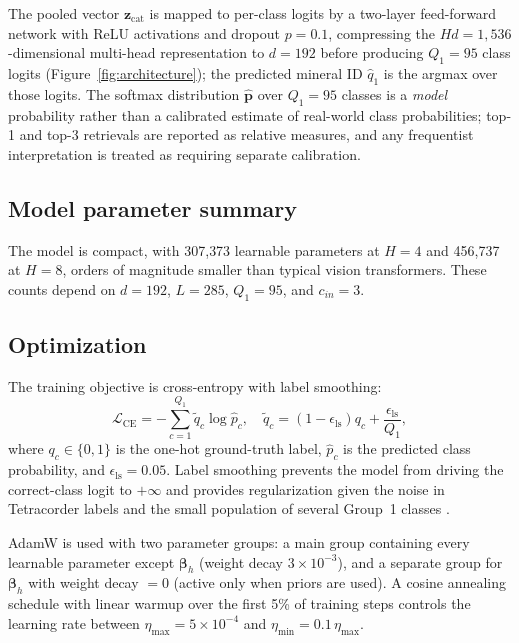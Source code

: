 \documentclass[preprint,12pt]{elsarticle}
\begin{document}
The pooled vector $\mathbf{z}_{\text{cat}}$ is mapped to per-class logits by a two-layer feed-forward network with ReLU activations and dropout $p = 0.1$, compressing the $Hd = 1{,}536$-dimensional multi-head representation to $d = 192$ before producing $Q_1 = 95$ class logits (Figure~\ref{fig:architecture}); the predicted mineral ID $\hat{q}_{1}$ is the argmax over those logits. The softmax distribution $\hat{\mathbf{p}}$ over $Q_1 = 95$ classes is a \emph{model} probability rather than a calibrated estimate of real-world class probabilities; top-1 and top-3 retrievals are reported as relative measures, and any frequentist interpretation is treated as requiring separate calibration.

\subsection{Model parameter summary}

The model is compact, with 307{,}373 learnable parameters at $H = 4$ and 456{,}737 at $H = 8$, orders of magnitude smaller than typical vision transformers. These counts depend on $d = 192$, $L = 285$, $Q_1 = 95$, and $c_{in} = 3$.

\subsection{Optimization}
\label{sec:optimization}

The training objective is cross-entropy with label smoothing:
\begin{equation}
\mathcal{L}_{\text{CE}} = -\sum_{c=1}^{Q_1} \tilde{q}_c \log \hat{p}_c, \quad \tilde{q}_c = (1 - \epsilon_{\text{ls}}) q_c + \frac{\epsilon_{\text{ls}}}{Q_1},
\label{eq:ce_loss}
\end{equation}
where $q_c \in \{0,1\}$ is the one-hot ground-truth label, $\hat{p}_c$ is the predicted class probability, and $\epsilon_{\text{ls}} = 0.05$. Label smoothing prevents the model from driving the correct-class logit to $+\infty$ and provides regularization given the noise in Tetracorder labels and the small population of several Group~1 classes \cite{szegedy2016rethinking}.

AdamW \cite{loshchilov2019adamw} is used with two parameter groups: a main group containing every learnable parameter except $\bm{\beta}_h$ (weight decay $3 \times 10^{-3}$), and a separate group for $\bm{\beta}_h$ with weight decay $= 0$ (active only when priors are used). A cosine annealing schedule with linear warmup over the first 5\% of training steps controls the learning rate between $\eta_{\max} = 5 \times 10^{-4}$ and $\eta_{\min} = 0.1\,\eta_{\max}$.
\end{document}
